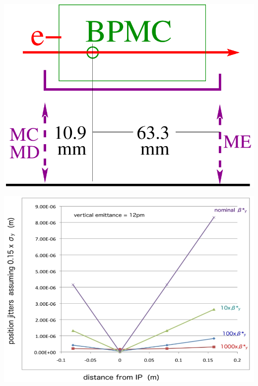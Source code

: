 \documentclass[a4paper,11pt]{book}
\begin{document}
\includegraphics[scale=0.25,angle=0]{fig26.pdf}


\includegraphics[scale=0.3,angle=0]{pos_beta2}
\end{document}
